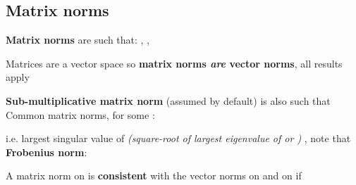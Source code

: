 \subsection*{Matrix norms}

\begin{itemize}

      \vItem
            \textbf{Matrix norms} are such that:
            ,
            ,

            \begin{itemize}

                  \vItem
                        Matrices  are a vector space so
                        \textbf{matrix norms \emph{are} vector norms}, all results apply
            \end{itemize}
      \vItem
            \textbf{Sub-multiplicative matrix norm} (assumed by default) is also
            such that
      \vItem
            Common matrix norms, for some
            :

            \begin{itemize}

                  \vItem
                  \vItem
                        i.e. largest singular value of  \emph{(square-root of largest eigenvalue of  or
                              )}
                  \vItem
                        ,
                        note that
                  \vItem
                        \textbf{Frobenius norm}:
            \end{itemize}
      \vItem
            A matrix norm \iMbox{\|\cdot\|} on  is
            \textbf{consistent} with the vector norms  on
             and  on 
            if


\end{itemize}
